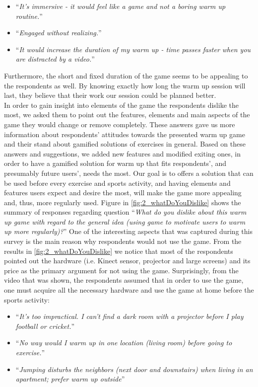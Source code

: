 \begin{itemize}
\item ``\textit{It's immersive - it would feel like a game and not a boring warm up routine.}''
\item ``\textit{Engaged without realizing.}''
\item ``\textit{It would increase the duration of my warm up - time passes faster when you are distracted by a video.}''
\end{itemize} 
Furthermore, the short and fixed duration of the game seems to be appealing to the respondents as well. By knowing exactly how long the warm up session will last, they believe that their work our session could be planned better.\\
In order to gain insight into elements of the game the respondents dislike the most, we asked them to point out the features, elements and main aspects of the game they would change or remove completely. These answers gave us more information about respondents' attitudes towards the presented warm up game and their stand about gamified solutions of exercises in general. Based on these answers and suggestions, we added new features and modified exiting ones, in order to have a gamified solution for warm up that fits respondents', and presumably future users', needs the most. Our goal is to offers a solution that can be used before every exercise and sports activity, and having elements and features users expect and desire the most, will make the game more appealing and, thus, more regularly used.
Figure in \ref{fig:2_whatDoYouDislike} shows the summary of responses regarding question ``\textit{What do you dislike about this warm up game with regard to the general idea (using game to motivate users to warm up more regularly)?}''
One of the interesting aspects that was captured during this survey is the main reason why respondents would not use the game. From the results in \ref{fig:2_whatDoYouDislike} we notice that most of the respondents pointed out the hardware (i.e. Kinect sensor, projector and large screens) and its price as the primary argument for not using the game. Surprisingly, from the video that was shown, the respondents assumed that in order to use the game, one must acquire all the necessary hardware and use the game at home before the sports activity:
\begin{itemize}
\item ``\textit{It's too impractical. I can't find a dark room with a projector before I play football or cricket.}''
\item ``\textit{No way would I warm up in one location (living room) before going to exercise.}''
\item ``\textit{Jumping disturbs the neighbors (next door and downstairs) when living in an apartment; prefer warm up outside}''
\end{itemize} 
